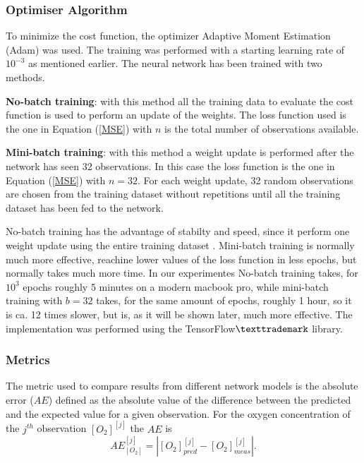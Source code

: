 \documentclass[9pt,twocolumn,twoside,pdftex]{optica}
\begin{document}
\subsubsection{Optimiser Algorithm}

To minimize the cost function, the optimizer Adaptive Moment Estimation (Adam) \cite{Kingma2014, Michelucci2017} was used. The training was performed with a starting learning rate of $10^{-3}$ as mentioned earlier. The neural network has been trained with two methods. 

{\bf No-batch training}:
with this method all the training data to evaluate the cost function is used to perform an update of the weights. The loss function used is the one in Equation (\ref{MSE}) with $n$ is the total number of observations available.

{\bf Mini-batch training}:
with this method a weight update is performed after the network has seen 32 observations. In this case the loss function is the one in Equation (\ref{MSE}) with $n=32$. For each weight update, 32 random observations are chosen from the training dataset without repetitions until all the training dataset has been fed to the network.  

No-batch training has the advantage of stabilty and speed, since it perform one weight update using the entire training dataset \cite{Michelucci2017}. Mini-batch training is normally much more effective, reachine lower values of the loss function in less epochs, but normally takes much more time. In our experimentes No-batch training takes, for $10^3$ epochs roughly 5 minutes on a modern macbook pro, while mini-batch training with $b=32$ takes, for the same amount of epochs, roughly 1 hour, so it is ca. 12 times slower, but is, as it will be shown later, much more effective. 
The implementation was performed using the TensorFlow$\texttrademark$ library. 

\subsubsection{Metrics}

The metric used to compare results from different network models is the absolute error ($AE$) defined as the absolute value of the difference between the predicted and the expected value for a given observation. For the oxygen concentration of the 
$j^{th}$ observation $[O_2]^{[j]}$  the $AE$ is 
\begin{equation}
\label{AE}
AE^{[j]}_{[O_2]} = |[O_2]^{[j]}_{pred}-[O_2]^{[j]}_{meas}|.
\end{equation}
\end{document}
